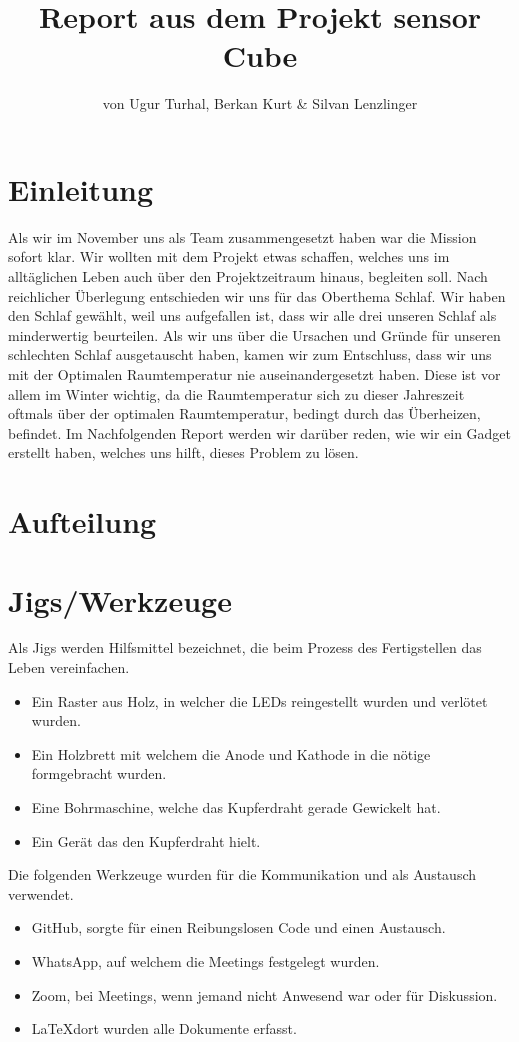 \documentclass{article}
\title{Report aus dem Projekt sensor Cube}
\author{von Ugur Turhal, Berkan Kurt \& Silvan Lenzlinger}
\begin{document}
\maketitle
{}
\section{Einleitung}
Als wir im November uns als Team zusammengesetzt haben war die Mission sofort klar. Wir wollten mit dem Projekt etwas schaffen, welches uns im alltäglichen Leben auch über den Projektzeitraum hinaus, begleiten soll.
Nach reichlicher Überlegung entschieden wir uns für das Oberthema Schlaf. Wir haben den Schlaf gewählt, weil uns aufgefallen ist, dass wir alle drei unseren Schlaf als minderwertig beurteilen. Als wir uns über die Ursachen und Gründe für unseren schlechten Schlaf ausgetauscht haben, kamen wir zum Entschluss, dass wir uns mit der Optimalen Raumtemperatur nie auseinandergesetzt haben. Diese ist vor allem im Winter wichtig, da die Raumtemperatur sich zu dieser Jahreszeit oftmals über der optimalen Raumtemperatur, bedingt durch das Überheizen, befindet.
Im Nachfolgenden Report werden wir darüber reden, wie wir ein Gadget erstellt haben, welches uns hilft, dieses Problem zu lösen.

\section{Aufteilung}

\section{Jigs/Werkzeuge}
Als Jigs werden Hilfsmittel bezeichnet, die beim Prozess des Fertigstellen das Leben vereinfachen. 
\begin{itemize}
\item Ein Raster aus Holz, in welcher die LEDs reingestellt wurden und verlötet wurden.
\item  Ein Holzbrett mit welchem die Anode und Kathode in die nötige formgebracht wurden.
\item Eine Bohrmaschine, welche das Kupferdraht gerade Gewickelt hat.
\item Ein Gerät das den Kupferdraht hielt.   
\end{itemize}
Die folgenden Werkzeuge wurden für die Kommunikation und als Austausch verwendet.
\begin{itemize}
\item GitHub, sorgte für einen Reibungslosen Code und einen Austausch.
\item WhatsApp, auf welchem die Meetings festgelegt wurden.
\item Zoom, bei Meetings, wenn jemand nicht Anwesend war oder für Diskussion.
\item \LaTeX \text{ }dort wurden alle Dokumente erfasst.
\end{itemize} 
\end{document}
